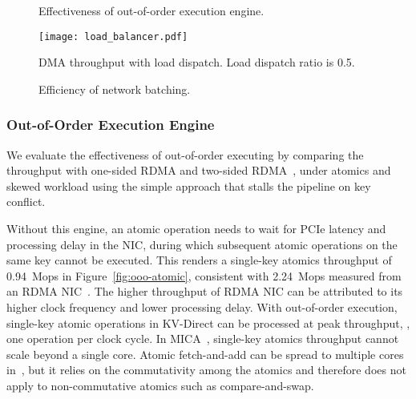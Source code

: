 \begin{figure}[t]
\centering
{}
\caption{Effectiveness of out-of-order execution engine.}
\label{fig:ooo-eval}
\vspace{-20pt}
\end{figure}

\begin{figure}[t]
\centering
{\texttt{[image: load\_balancer.pdf]}}
\caption{DMA throughput with load dispatch. Load dispatch ratio is 0.5.}
\label{fig:cache-tput}
\vspace{-25pt}
\end{figure}

\begin{figure}[t]
\centering
{}
\caption{Efficiency of network batching.}
\label{fig:eval-network-batching}
\vspace{-15pt}
\end{figure}

\subsubsection{Out-of-Order Execution Engine}
\label{sec:ooo-eval}

We evaluate the effectiveness of out-of-order executing by comparing the throughput with one-sided RDMA and two-sided RDMA~\cite{kalia2016design}, under atomics and skewed workload using the simple approach that stalls the pipeline on key conflict.

Without this engine, an atomic operation needs to wait for PCIe latency and processing delay in the NIC, during which subsequent atomic operations on the same key cannot be executed.
This renders a single-key atomics throughput of 0.94~Mops in Figure~\ref{fig:ooo-atomic}, consistent with 2.24~Mops measured from an RDMA NIC~\cite{kalia2016design}.
The higher throughput of RDMA NIC can be attributed to its higher clock frequency and lower processing delay.
With out-of-order execution, single-key atomic operations in KV-Direct can be processed at peak throughput, \ie, one operation per clock cycle.
In MICA~\cite{li2016full}, single-key atomics throughput cannot scale beyond a single core.
Atomic fetch-and-add can be spread to multiple cores in~\cite{kalia2016design}, but it relies on the commutativity among the atomics and therefore does not apply to non-commutative atomics such as compare-and-swap.

